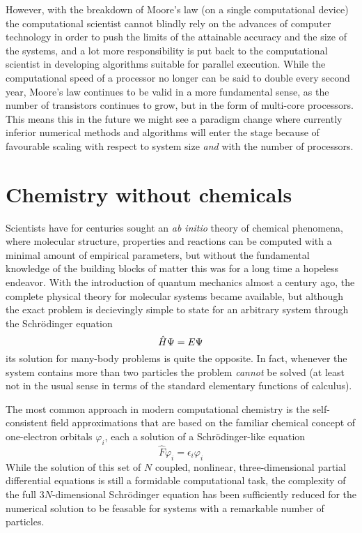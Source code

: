 However, with the breakdown of Moore's law (on a single computational device) the 
computational scientist cannot blindly rely on the advances of computer technology 
in order to push the limits of the attainable accuracy and the size of the systems, 
and a lot more responsibility is put back to the computational scientist in developing 
algorithms suitable for parallel execution. While the computational speed of a 
processor no longer can be said to double every second year, Moore's law continues 
to be valid in a more fundamental sense, as the number of transistors continues to 
grow, but in the form of multi-core processors. This means this in the future we 
might see a paradigm change where currently inferior numerical methods and algorithms 
will enter the stage because of favourable scaling with respect to system size 
\emph{and} with the number of processors.

\section{Chemistry without chemicals}
Scientists have for centuries sought an \emph{ab initio} theory of chemical phenomena, 
where molecular structure, properties and reactions can be computed with a minimal amount 
of empirical parameters, but without the fundamental knowledge of the building blocks of 
matter this was for a long time a hopeless endeavor. With the introduction of quantum 
mechanics almost a century ago, the complete physical theory for molecular systems became 
available, but although the exact problem is decievingly simple to state for an arbitrary 
system through the Schr\"{o}dinger equation
\begin{equation}
    \hat{H}\Psi = E\Psi
\end{equation}
its solution for many-body problems is quite the opposite. In fact, whenever the system 
contains more than two particles the problem \emph{cannot} be solved (at least not in 
the usual sense in terms of the standard elementary functions of calculus).

The most common approach in modern computational chemistry is the self-consistent field 
approximations that are based on the familiar chemical concept of one-electron orbitals
$\varphi_i$, each a solution of a Schr\"{o}dinger-like equation
\begin{equation}
    \hat{F}\varphi_i = \epsilon_i\varphi_i
\end{equation}
While the solution of this set of $N$ coupled, nonlinear, three-dimensional partial
differential equations is still a formidable computational task, the complexity of the 
full $3N$-dimensional Schr\"{o}dinger equation has been sufficiently reduced for the 
numerical solution to be feasable for systems with a remarkable number of particles.

